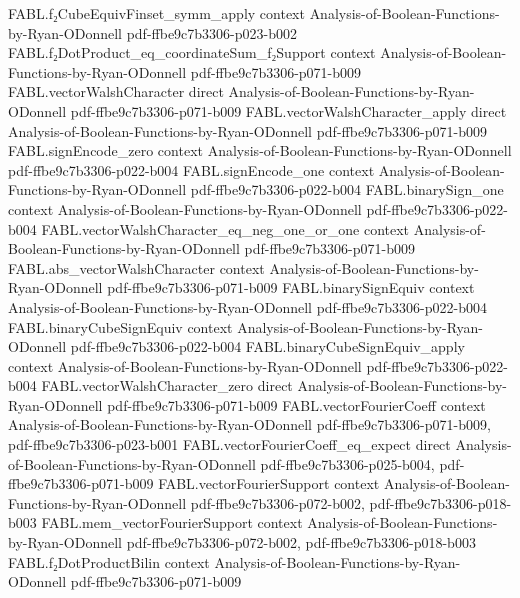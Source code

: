 \begin{theorem}
  {FABL.f₂CubeEquivFinset_symm_apply}
  {context}
  {Analysis-of-Boolean-Functions-by-Ryan-ODonnell}
  {pdf-ffbe9c7b3306-p023-b002}
\proofstep
  {FABL.f₂DotProduct_eq_coordinateSum_f₂Support}
  {context}
  {Analysis-of-Boolean-Functions-by-Ryan-ODonnell}
  {pdf-ffbe9c7b3306-p071-b009}
\proofstep
  {FABL.vectorWalshCharacter}
  {direct}
  {Analysis-of-Boolean-Functions-by-Ryan-ODonnell}
  {pdf-ffbe9c7b3306-p071-b009}
\proofstep
  {FABL.vectorWalshCharacter_apply}
  {direct}
  {Analysis-of-Boolean-Functions-by-Ryan-ODonnell}
  {pdf-ffbe9c7b3306-p071-b009}
\proofstep
  {FABL.signEncode_zero}
  {context}
  {Analysis-of-Boolean-Functions-by-Ryan-ODonnell}
  {pdf-ffbe9c7b3306-p022-b004}
\proofstep
  {FABL.signEncode_one}
  {context}
  {Analysis-of-Boolean-Functions-by-Ryan-ODonnell}
  {pdf-ffbe9c7b3306-p022-b004}
\proofstep
  {FABL.binarySign_one}
  {context}
  {Analysis-of-Boolean-Functions-by-Ryan-ODonnell}
  {pdf-ffbe9c7b3306-p022-b004}
\proofstep
  {FABL.vectorWalshCharacter_eq_neg_one_or_one}
  {context}
  {Analysis-of-Boolean-Functions-by-Ryan-ODonnell}
  {pdf-ffbe9c7b3306-p071-b009}
\proofstep
  {FABL.abs_vectorWalshCharacter}
  {context}
  {Analysis-of-Boolean-Functions-by-Ryan-ODonnell}
  {pdf-ffbe9c7b3306-p071-b009}
\proofstep
  {FABL.binarySignEquiv}
  {context}
  {Analysis-of-Boolean-Functions-by-Ryan-ODonnell}
  {pdf-ffbe9c7b3306-p022-b004}
\proofstep
  {FABL.binaryCubeSignEquiv}
  {context}
  {Analysis-of-Boolean-Functions-by-Ryan-ODonnell}
  {pdf-ffbe9c7b3306-p022-b004}
\proofstep
  {FABL.binaryCubeSignEquiv_apply}
  {context}
  {Analysis-of-Boolean-Functions-by-Ryan-ODonnell}
  {pdf-ffbe9c7b3306-p022-b004}
\proofstep
  {FABL.vectorWalshCharacter_zero}
  {direct}
  {Analysis-of-Boolean-Functions-by-Ryan-ODonnell}
  {pdf-ffbe9c7b3306-p071-b009}
\proofstep
  {FABL.vectorFourierCoeff}
  {context}
  {Analysis-of-Boolean-Functions-by-Ryan-ODonnell}
  {pdf-ffbe9c7b3306-p071-b009,
    pdf-ffbe9c7b3306-p023-b001}
\proofstep
  {FABL.vectorFourierCoeff_eq_expect}
  {direct}
  {Analysis-of-Boolean-Functions-by-Ryan-ODonnell}
  {pdf-ffbe9c7b3306-p025-b004,
    pdf-ffbe9c7b3306-p071-b009}
\proofstep
  {FABL.vectorFourierSupport}
  {context}
  {Analysis-of-Boolean-Functions-by-Ryan-ODonnell}
  {pdf-ffbe9c7b3306-p072-b002,
    pdf-ffbe9c7b3306-p018-b003}
\proofstep
  {FABL.mem_vectorFourierSupport}
  {context}
  {Analysis-of-Boolean-Functions-by-Ryan-ODonnell}
  {pdf-ffbe9c7b3306-p072-b002,
    pdf-ffbe9c7b3306-p018-b003}
\proofstep
  {FABL.f₂DotProductBilin}
  {context}
  {Analysis-of-Boolean-Functions-by-Ryan-ODonnell}
  {pdf-ffbe9c7b3306-p071-b009}
\proofstep

\end{theorem}

